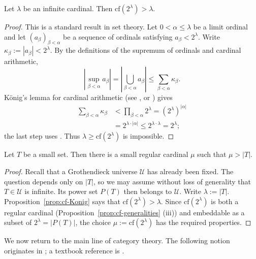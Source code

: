 \begin{proposition}\label{prop:cf-Konig}
	Let $\lambda$ be an infinite cardinal. Then $\mathrm{cf}(2^\lambda)>\lambda$.
\end{proposition}
\begin{proof}
	This is a standard result in set theory. Let $0<\alpha\leq\lambda$ be a limit ordinal and let $(a_\beta)_{\beta<\alpha}$ be a sequence of ordinals satisfying $a_\beta<2^\lambda$. Write $\kappa_\beta:=|a_\beta|<2^\lambda$. By the definitions of the supremum of ordinals and cardinal arithmetic,
	\[ \left| \sup_{\beta < \alpha} a_\beta \right| = \left| \bigcup_{\beta < \alpha} a_\beta \right| \leq \sum_{\beta < \alpha} \kappa_\beta. \]
	König's lemma for cardinal arithmetic (see \cite[Exercise 1.6]{Li1}, or \cite[Theorem 5.10]{Je03}) gives
	\begin{align*}
		\sum_{\beta < \alpha} \kappa_\beta & < \prod_{\beta < \alpha} 2^\lambda = (2^\lambda)^{|\alpha|} \\
		& = 2^{\lambda \cdot |\alpha|} \leq 2^{\lambda \cdot \lambda} = 2^\lambda ;
	\end{align*}
	the last step uses \cite[Theorem 1.4.8]{Li1}. Thus $\lambda\geq\mathrm{cf}(2^\lambda)$ is impossible.
\end{proof}

\begin{lemma}\label{prop:enough-regular-cardinal}
	Let $T$ be a small set. Then there is a small regular cardinal $\mu$ such that $\mu>|T|$.
\end{lemma}
\begin{proof}
	Recall that a Grothendieck universe $\mathcal{U}$ has already been fixed. The question depends only on $|T|$, so we may assume without loss of generality that $T\in\mathcal{U}$ is infinite. Its power set $P(T)$ then belongs to $\mathcal{U}$. Write $\lambda:=|T|$. Proposition~\ref{prop:cf-Konig} says that $\mathrm{cf}(2^\lambda)>\lambda$. Since $\mathrm{cf}(2^\lambda)$ is both a regular cardinal (Proposition~\ref{prop:cf-generalities} (iii)) and embeddable as a subset of $2^\lambda=|P(T)|$, the choice $\mu:=\mathrm{cf}(2^\lambda)$ has the required properties.
\end{proof}

We now return to the main line of category theory. The following notion originates in \cite{GU71}; a textbook reference is \cite[Chapters 1, 2]{AR94}.


